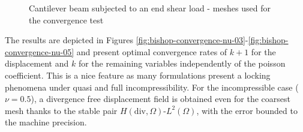 \documentclass{wccm2024}
\begin{document}
\begin{figure}[!htb]
	\centering
	\hfill
	\caption{Cantilever beam subjected to an end shear load - meshes used for the convergence test}
	\label{fig:bishop-meshes}
\end{figure}

The results are depicted in Figures \ref{fig:bishop-convergence-nu-03}-\ref{fig:bishop-convergence-nu-05} and present optimal convergence rates of $k+1$ for the displacement and $k$ for the remaining variables independently of the poisson coefficient. This is a nice feature as many formulations present a locking phenomena under quasi and full incompressibility. For the incompressible case ($\nu=0.5$), a divergence free displacement field is obtained even for the coarsest mesh thanks to the stable pair $H(\text{div},\Omega)$-$L^2(\Omega)$, with the error bounded to the machine precision.
\end{document}
